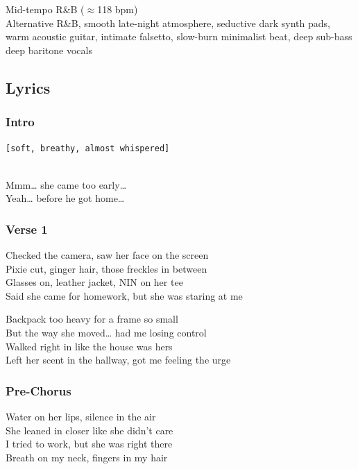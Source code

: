 Mid-tempo R\&B (\(\approx\)118 bpm)\\
Alternative R\&B, smooth late-night atmosphere, seductive dark synth
pads, warm acoustic guitar, intimate falsetto, slow-burn minimalist
beat, deep sub-bass\\
deep baritone vocals

\subsection{Lyrics}\label{lyrics-41}

\subsubsection{Intro}\label{intro-4}

\texttt{{[}soft,\ breathy,\ almost\ whispered{]}}\strut \\
Mmm\ldots{} she came too early\ldots{}\\
Yeah\ldots{} before he got home\ldots{}

\subsubsection{Verse 1}\label{verse-1-33}

Checked the camera, saw her face on the screen\\
Pixie cut, ginger hair, those freckles in between\\
Glasses on, leather jacket, NIN on her tee\\
Said she came for homework, but she was staring at me

Backpack too heavy for a frame so small\\
But the way she moved\ldots{} had me losing control\\
Walked right in like the house was hers\\
Left her scent in the hallway, got me feeling the urge

\subsubsection{Pre-Chorus}\label{pre-chorus-67}

Water on her lips, silence in the air\\
She leaned in closer like she didn't care\\
I tried to work, but she was right there\\
Breath on my neck, fingers in my hair


